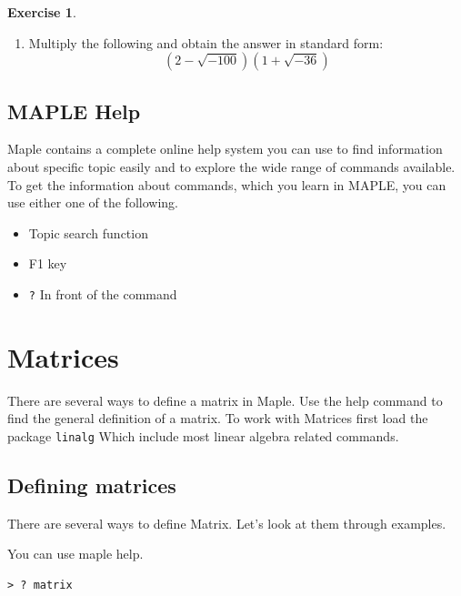 \documentclass[
]{book}
\providecommand{\tightlist}{%
  \setlength{\itemsep}{0pt}\setlength{\parskip}{0pt}}
\theoremstyle{definition}
\theoremstyle{definition}
\theoremstyle{definition}
\newtheorem{exercise}{Exercise}[chapter]
\theoremstyle{definition}
\theoremstyle{remark}
\begin{document}
\begin{exercise}
\protect\hypertarget{exr:unnamed-chunk-12}{}\label{exr:unnamed-chunk-12}\leavevmode

\begin{enumerate}
\def\labelenumi{\arabic{enumi}.}
\setcounter{enumi}{2}
\tightlist
\item
  Multiply the following and obtain the answer in standard form:
  \[(2 − \sqrt{−100})(1 + \sqrt{−36})\]
\end{enumerate}

\end{exercise}

\section{MAPLE Help}\label{maple-help}

Maple contains a complete online help system you can use to find information about specific topic easily and to explore the wide range of commands available. To get the information about commands, which you learn in MAPLE, you can use either one of the following.

\begin{itemize}
\tightlist
\item
  Topic search function
\item
  F1 key
\item
  \texttt{?} In front of the command
\end{itemize}

\chapter{Matrices}\label{matrices}

There are several ways to define a matrix in Maple.
Use the help command to find the general definition of a matrix.
To work with Matrices first load the package \texttt{linalg} Which include most linear algebra related commands.

\section{Defining matrices}\label{defining-matrices}

There are several ways to define Matrix. Let's look at them through examples.

You can use maple help.

\begin{verbatim}
> ? matrix
\end{verbatim}
\end{document}
